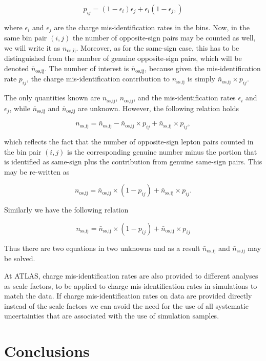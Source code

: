 $$p_{ij} = (1-\epsilon_i)\epsilon_j +  \epsilon_i(1-\epsilon_j,)$$

where $\epsilon_i$ and $\epsilon_j$ are the charge mis-identification rates in
the bins. Now, in the same bin pair $(i,j)$ the number of opposite-sign pairs
may be counted as well, we will write it as $n_{\text{os,ij}}$. Moreover, as
for the same-sign case, this has to be distinguished from the number of genuine
opposite-sign pairs, which will be denoted $\bar{n}_{\text{os,ij}}$. The number
of interest is $\bar{n}_{\text{os,ij}}$, because given the mis-identification
rate $p_{ij}$, the charge mis-identification contribution to $n_{\text{ss,ij}}$
is simply $\bar{n}_{\text{os,ij}}\times p_{ij}$.


The only quantities known are $n_{\text{ss,ij}}$, $n_{\text{os,ij}}$, and the
mis-identification rates $\epsilon_i$ and $\epsilon_j$, while
$\bar{n}_{\text{ss,ij}}$ and $\bar{n}_{\text{os,ij}}$ are unknown. However, the
following relation holds

$$n_{\text{os,ij}} = \bar{n}_{\text{os,ij}} - \bar{n}_{\text{os,ij}}\times
	p_{ij} + \bar{n}_{\text{ss,ij}}\times p_{ij},$$

which reflects the fact that the number of opposite-sign lepton pairs counted
in the bin pair $(i,j)$ is the corresponding genuine number minus the portion
that is identified as same-sign plus the contribution from genuine same-sign
pairs. This may be re-written as

$$ n_{\text{os,ij}} = \bar{n}_{\text{os,ij}}\times (1 - p_{ij}) +
	\bar{n}_{\text{ss,ij}} \times p_{ij}. $$

Similarly we have the following relation

$$ n_{\text{ss,ij}} = \bar{n}_{\text{ss,ij}}\times (1 - p_{ij}) +
	\bar{n}_{\text{os,ij}} \times p_{ij} $$

Thus there are two equations in two unknowns and as a result
$\bar{n}_{\text{os,ij}}$ and $\bar{n}_{\text{ss,ij}}$ may be solved.

At ATLAS, charge mis-identification rates are also provided to different
analyses as scale factors, to be applied to charge mis-identification rates in
simulations to match the data. If charge mis-identification rates on data are
provided directly instead of the scale factors we can avoid the need for the
use of all systematic uncertainties that are associated with the use of
simulation samples.


\section{Conclusions}\label{s:chargecon}

